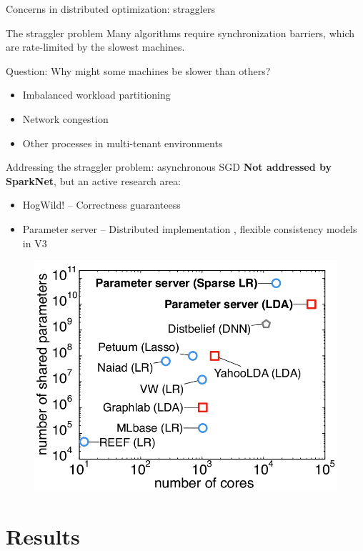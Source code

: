 \documentclass[pdf]{beamer}
\begin{document}
\begin{frame}{Concerns in distributed optimization: stragglers}
    \begin{block}{The straggler problem}
        Many algorithms require synchronization barriers, which are rate-limited
        by the slowest machines.
    \end{block}

    \begin{alertblock}{Question: Why might some machines be slower than others?}
        \pause
        \begin{itemize}
            \item Imbalanced workload partitioning
            \item Network congestion
            \item Other processes in multi-tenant environments
        \end{itemize}
    \end{alertblock}
\end{frame}

\begin{frame}{Addressing the straggler problem: asynchronous SGD}
    \textbf{Not addressed by SparkNet}, but an active research area:
    \begin{itemize}
        \item HogWild! -- Correctness guaranteess \cite{recht2011hogwild}
        \item Parameter server -- Distributed implementation \cite{ho2013more},
            flexible consistency models in V3 \cite{li2013parameter}
    \end{itemize}

    \begin{figure}[htpb]
        \centering
        \includegraphics[width=0.5\linewidth]{Figures/parameter-servers.png}
    \end{figure}
\end{frame}

\section{Results}
\end{document}

